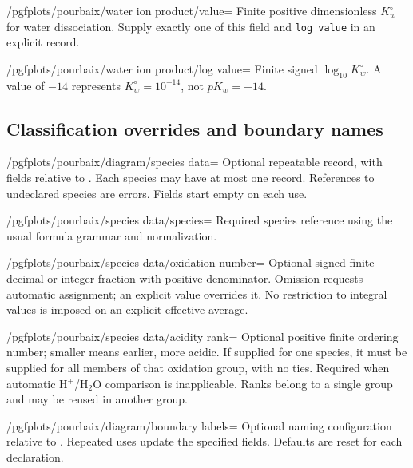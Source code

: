 \documentclass[a4paper,11pt]{ltxdoc}
\begin{document}
\begin{key}{/pgfplots/pourbaix/water ion product/value=}
Finite positive dimensionless $K_w^\circ$ for water dissociation. Supply exactly
one of this field and \texttt{log value} in an explicit record.
\end{key}
\begin{key}{/pgfplots/pourbaix/water ion product/log value=}
Finite signed $\log_{10}K_w^\circ$. A value of $-14$ represents $K_w^\circ=10^{-14}$,
not $pK_w=-14$.
\end{key}

\subsection{Classification overrides and boundary names}
\begin{key}{/pgfplots/pourbaix/diagram/species data=}
Optional repeatable record, with fields relative to
. Each species may have at most one record.
References to undeclared species are errors. Fields start empty on each use.
\end{key}
\begin{key}{/pgfplots/pourbaix/species data/species=}
Required species reference using the usual formula grammar and normalization.
\end{key}
\begin{key}{/pgfplots/pourbaix/species data/oxidation number=}
Optional signed finite decimal or integer fraction with positive denominator.
Omission requests automatic assignment; an explicit value overrides it. No
restriction to integral values is imposed on an explicit effective average.
\end{key}
\begin{key}{/pgfplots/pourbaix/species data/acidity rank=}
Optional positive finite ordering number; smaller means earlier, more acidic.
If supplied for one species, it must be supplied for all members of that oxidation
group, with no ties. Required when automatic H$^+$/H$_2$O comparison is inapplicable.
Ranks belong to a single group and may be reused in another group.
\end{key}
\begin{key}{/pgfplots/pourbaix/diagram/boundary labels=}
Optional naming configuration relative to .
Repeated uses update the specified fields. Defaults are reset for each declaration.
\end{key}
\end{document}
